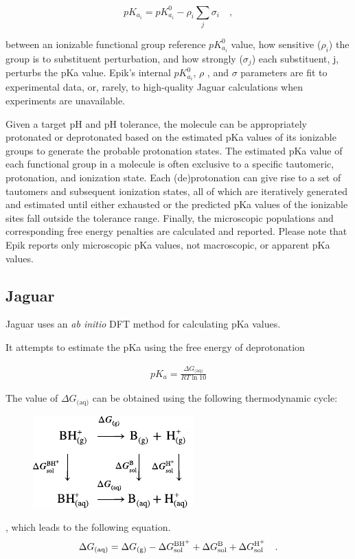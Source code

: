 \documentclass[9pt,lineno,final]{elife}
\begin{document}
\begin{equation}
 pK_{a_i} = pK_{a_i}^0 - \rho_i  \sum_j \sigma_i \quad ,
\end{equation}

between an ionizable functional group reference $pK_{a_i}^0$ value, how sensitive ($\rho_i$) the group is to substituent perturbation, and how strongly ($\sigma_j$) each substituent, j, perturbs the pKa value. Epik’s internal $pK_{a_i}^0$, $\rho$ , and $\sigma$  parameters are fit to experimental data, or, rarely, to high-quality Jaguar calculations when experiments are unavailable.

Given a target pH and pH tolerance, the molecule can be appropriately protonated or deprotonated based on the estimated pKa values of its ionizable groups to generate the probable protonation states. The estimated pKa value of each functional group in a molecule is often exclusive to a specific tautomeric, protonation, and ionization state. Each (de)protonation can give rise to a set of tautomers and subsequent ionization states, all of which are iteratively generated and estimated until either exhausted or the predicted pKa values of the ionizable sites fall outside the tolerance range. Finally, the microscopic populations and corresponding free energy penalties are calculated and reported. Please note that Epik reports only microscopic pKa values, not macroscopic, or apparent pKa values.

\subsection{Jaguar}

Jaguar uses an \textit{ab initio} DFT method for calculating pKa values. 

It attempts to estimate the pKa using the free energy of deprotonation  

\begin{align}
 pK_a = \frac{\Delta G_\textrm{(aq)}}{RT \ln 10}  
\end{align}

The value of $ \Delta G_\textrm{(aq)}$ can be obtained using the following thermodynamic cycle:
%
\begin{figure}[H]
\centering
 \includegraphics{jaguar-reaction}
\end{figure}
%
, which leads to the following equation.
%
\begin{equation}
 \Delta G_\textrm{(aq)} = \Delta G_\textrm{(g)} - \Delta G^\textrm{\ce{BH+}}_\textrm{sol} + \Delta G^\textrm{\ce{B}}_\textrm{sol}  +  \Delta G^\textrm{\ce{H+}}_\textrm{sol} \quad .
\end{equation}
\end{document}

